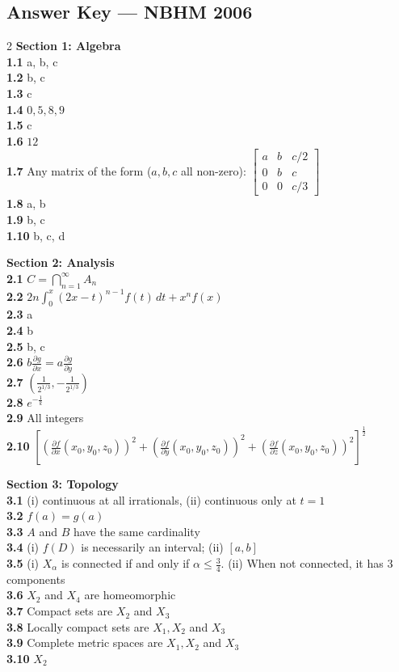 \documentclass[11pt,a4paper]{article}
\newcommand{\examsec}[1]{%
  \subsection*{#1}
  \vspace{-2pt}
}
\begin{document}
\examsec{Answer Key --- NBHM 2006}
\begin{multicols}{2}
\textbf{Section 1: Algebra}\\
\textbf{1.1} a, b, c\\
\textbf{1.2} b, c\\
\textbf{1.3} c\\
\textbf{1.4} $0, 5, 8, 9$\\
\textbf{1.5} c\\
\textbf{1.6} $12$\\
\textbf{1.7} Any matrix of the form ($a, b, c$ all non-zero):
$\begin{bmatrix} a & b & c/2 \\ 0 & b & c \\ 0 & 0 & c/3 \end{bmatrix}$\\
\textbf{1.8} a, b\\
\textbf{1.9} b, c\\
\textbf{1.10} b, c, d

\medskip
\textbf{Section 2: Analysis}\\
\textbf{2.1} $C = \bigcap_{n=1}^{\infty} A_n$\\
\textbf{2.2} $2n\int_0^x (2x - t)^{n-1} f(t)\,dt + x^n f(x)$\\
\textbf{2.3} a\\
\textbf{2.4} b\\
\textbf{2.5} b, c\\
\textbf{2.6} $b\frac{\partial g}{\partial x} = a\frac{\partial g}{\partial y}$\\
\textbf{2.7} $\left(\frac{1}{2^{1/3}}, -\frac{1}{2^{1/3}}\right)$\\
\textbf{2.8} $e^{-\frac{1}{k}}$\\
\textbf{2.9} All integers\\
\textbf{2.10} $\left[\left(\frac{\partial f}{\partial x}(x_0, y_0, z_0)\right)^2 + \left(\frac{\partial f}{\partial y}(x_0, y_0, z_0)\right)^2 + \left(\frac{\partial f}{\partial z}(x_0, y_0, z_0)\right)^2\right]^{\frac{1}{2}}$

\medskip
\textbf{Section 3: Topology}\\
\textbf{3.1} (i) continuous at all irrationals, (ii) continuous only at $t = 1$\\
\textbf{3.2} $f(a) = g(a)$\\
\textbf{3.3} $A$ and $B$ have the same cardinality\\
\textbf{3.4} (i) $f(D)$ is necessarily an interval; (ii) $[a, b]$\\
\textbf{3.5} (i) $X_\alpha$ is connected if and only if $\alpha \le \frac{3}{4}$. (ii) When not connected, it has $3$ components\\
\textbf{3.6} $X_2$ and $X_4$ are homeomorphic\\
\textbf{3.7} Compact sets are $X_2$ and $X_3$\\
\textbf{3.8} Locally compact sets are $X_1, X_2$ and $X_3$\\
\textbf{3.9} Complete metric spaces are $X_1, X_2$ and $X_3$\\
\textbf{3.10} $X_2$


\end{multicols}
\end{document}
